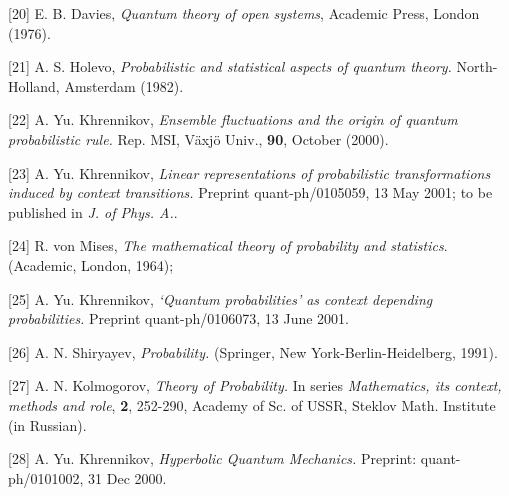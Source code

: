 \documentclass[12pt,oneside,final,a4paper]{article}
\begin{document}
[20] E. B. Davies, {\it Quantum theory of open systems}, Academic Press, 
London (1976).

[21] A. S. Holevo, {\it Probabilistic and 
statistical aspects of quantum 
theory.} North-Holland, Amsterdam (1982).

[22] A. Yu. Khrennikov, {\it Ensemble fluctuations and the origin of
quantum probabilistic rule.} Rep. MSI, V\"axj\"o Univ., {\bf 90}, October (2000).


[23] A. Yu. Khrennikov, {\it Linear representations of probabilistic
transformations induced
by context transitions.} Preprint quant-ph/0105059, 13 May 2001;
to be published in {\it J. of Phys. A.}.

[24] R.  von Mises, {\it The mathematical theory of probability and
 statistics}. (Academic, London,  1964);

[25] A. Yu. Khrennikov, {\it `Quantum probabilities'  as context depending
probabilities.}
Preprint quant-ph/0106073, 13 June 2001.

[26] A. N. Shiryayev, {\it Probability.} (Springer, New York-Berlin-Heidelberg, 1991). 

 
[27]   A. N. Kolmogorov, {\it Theory of Probability.} In series {\it Mathematics, its context, methods and role},
{\bf 2}, 252-290, Academy of Sc. of USSR, Steklov Math. Institute (in Russian).
 
[28] A. Yu. Khrennikov, {\it Hyperbolic Quantum Mechanics.} Preprint: quant-ph/0101002, 31 Dec 2000.
\end{document}
